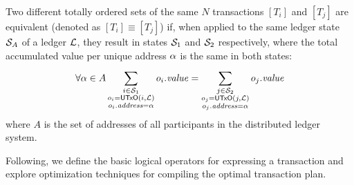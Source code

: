 \begin{definition}\label{def:equiv_total_orders_of_txs}
    Two different totally ordered sets of the same $N$ transactions $[T_i]$ and
    $[T_j]$ are equivalent (denoted as $[T_i]
    \equiv [T_j]$) if, when applied to the same ledger state $\mathcal{S}_A$
    of a ledger $\mathcal{L}$, they result in states $\mathcal{S}_1$ and
    $\mathcal{S}_2$ respectively, where the total accumulated value per unique
    address $\alpha$ is the same in both states:
    \[
    \forall \alpha \in A
    \sum_{\substack{i \in \mathcal{S}_1 \\ o_i = \mathsf{UTxO}(i, \mathcal{L}) \\
        o_i.\mathit{address} =
        \alpha }}^{} o_i.\mathit{value} =
    \sum_{\substack{ j \in \mathcal{S}_2 \\ o_j = \mathsf{UTxO}(j, \mathcal{L}) \\
        o_j.\mathit{address} =
        \alpha }}^{} o_j.\mathit{value}
    \]
    where $A$ is the set of addresses of all participants in the distributed
    ledger system.
\end{definition}

Following, we define the basic logical operators for expressing a transaction
and explore optimization techniques for compiling the optimal transaction plan.
